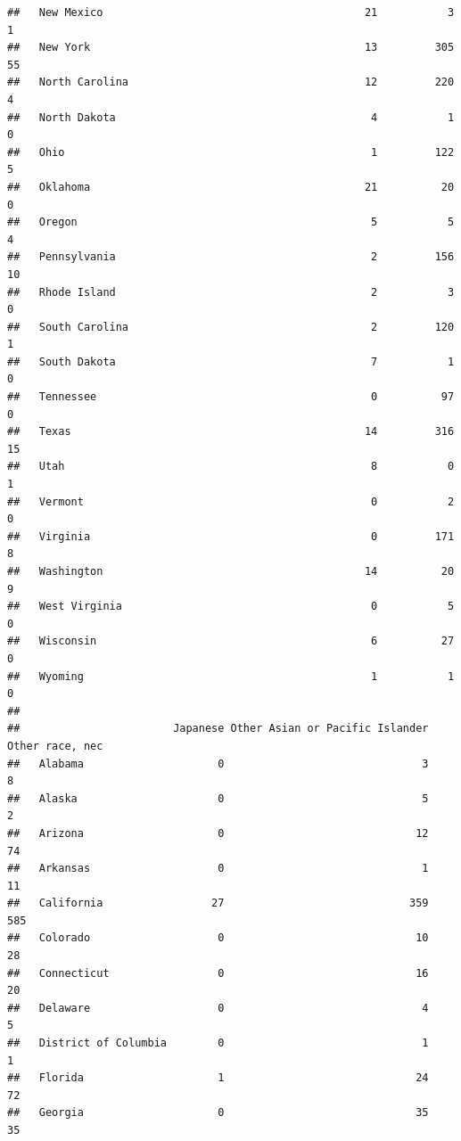 \documentclass[
]{book}
\theoremstyle{definition}
\theoremstyle{definition}
\theoremstyle{definition}
\theoremstyle{definition}
\theoremstyle{remark}
\begin{document}
\begin{verbatim}
##   New Mexico                                         21           3       1
##   New York                                           13         305      55
##   North Carolina                                     12         220       4
##   North Dakota                                        4           1       0
##   Ohio                                                1         122       5
##   Oklahoma                                           21          20       0
##   Oregon                                              5           5       4
##   Pennsylvania                                        2         156      10
##   Rhode Island                                        2           3       0
##   South Carolina                                      2         120       1
##   South Dakota                                        7           1       0
##   Tennessee                                           0          97       0
##   Texas                                              14         316      15
##   Utah                                                8           0       1
##   Vermont                                             0           2       0
##   Virginia                                            0         171       8
##   Washington                                         14          20       9
##   West Virginia                                       0           5       0
##   Wisconsin                                           6          27       0
##   Wyoming                                             1           1       0
##                       
##                        Japanese Other Asian or Pacific Islander Other race, nec
##   Alabama                     0                               3               8
##   Alaska                      0                               5               2
##   Arizona                     0                              12              74
##   Arkansas                    0                               1              11
##   California                 27                             359             585
##   Colorado                    0                              10              28
##   Connecticut                 0                              16              20
##   Delaware                    0                               4               5
##   District of Columbia        0                               1               1
##   Florida                     1                              24              72
##   Georgia                     0                              35              35

\end{verbatim}
\end{document}
